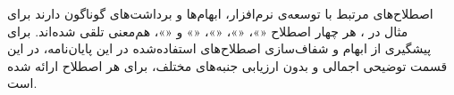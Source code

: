 
اصطلاح‌های مرتبط با توسعه‌ی نرم‌افزار، ابهام‌ها و برداشت‌های گوناگون دارند
برای مثال در ، هر چهار اصطلاح
«»، «»، «»، «» و «»،
هم‌معنی تلقی شده‌اند. برای پیشگیری از ابهام و شفاف‌سازی اصطلاح‌های استفاده‌شده
در این پایان‌نامه، در این قسمت توضیحی اجمالی و بدون ارزیابی جنبه‌های
مختلف، برای هر اصطلاح ارائه شده است.















